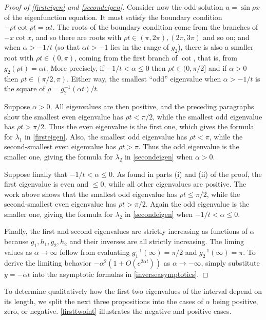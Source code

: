 \documentclass[12pt,reqno]{amsart}
\theoremstyle{definition}
\begin{document}
\begin{proof}[Proof of \autoref{firsteigen} and \autoref{secondeigen}]
Consider now the odd solution $u=\sin \rho x$ of the eigenfunction equation. It must satisfy the boundary condition $-\rho t \cot \rho t = \alpha t$. The roots of the boundary condition come from the branches of $-x\cot x$, and so there are roots with $\rho t \in (\pi,2\pi), (2\pi,3\pi)$ and so on; and when $\alpha > -1/t$ (so that $\alpha t > -1$ lies in the range of $g_2$), there is also a smaller root with $\rho t \in (0,\pi)$, coming from the first branch of $\cot$, that is, from $g_2(\rho t) = \alpha t$. More precisely, if $-1/t<\alpha \leq 0$ then $\rho t \in (0,\pi/2]$ and if $\alpha>0$ then $\rho t \in (\pi/2,\pi)$. Either way,  the smallest ``odd'' eigenvalue when $\alpha>-1/t$ is the square of $\rho = g_2^{-1}(\alpha t)/t$. 

Suppose $\alpha>0$. All eigenvalues are then positive, and the preceding paragraphs show the smallest even eigenvalue has $\rho t<\pi/2$, while the smallest odd eigenvalue has $\rho t>\pi/2$. Thus the even eigenvalue is the first one, which gives the formula for $\lambda_1$ in \autoref{firsteigen}. Also, the smallest odd eigenvalue has $\rho t < \pi$, while the second-smallest even eigenvalue has $\rho t > \pi$. Thus the odd eigenvalue is the smaller one, giving the formula for $\lambda_2$ in \autoref{secondeigen} when $\alpha>0$.

Suppose finally that $-1/t < \alpha \leq 0$. As found in parts (i) and (ii) of the proof, the first eigenvalue is even and $\leq 0$, while all other eigenvalues are positive. The work above shows that the smallest odd eigenvalue has $\rho t \leq \pi/2$, while the second-smallest even eigenvalue has $\rho t > \pi/2$. Again the odd eigenvalue is the smaller one, giving the formula for $\lambda_2$ in \autoref{secondeigen} when $-1/t < \alpha \leq 0$.

Finally, the first and second eigenvalues are strictly increasing as functions of $\alpha$ because $g_1, h_1, g_2, h_2$ and their inverses are all strictly increasing. The liming values as $\alpha \to \infty$ follow from evaluating $g_1^{-1}(\infty)=\pi/2$ and $g_2^{-1}(\infty)=\pi$. To derive the limiting behavior $-\alpha^2 \left(1+ O(e^{2\alpha t}) \right)$ as $\alpha \to -\infty$, simply substitute $y=-\alpha t$ into the asymptotic formulas in \autoref{inverseasymptotics}. 
\end{proof}
%
To determine qualitatively how the first two eigenvalues of the interval depend on its length, we split the next three propositions into the cases of $\alpha$ being positive, zero, or negative. \autoref{firsttwoint} illustrates the negative and positive cases.
\end{document}
